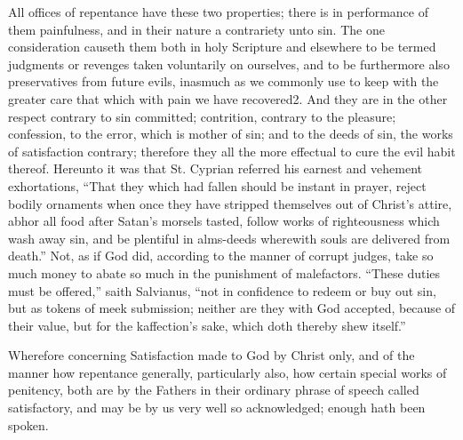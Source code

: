 All offices of repentance have these two properties; there is in performance of them painfulness, and in their nature a contrariety unto sin. The one consideration causeth them both in holy Scripture and elsewhere to be termed judgments or revenges taken voluntarily on ourselves, and to be furthermore also preservatives from future evils, inasmuch as we commonly use to keep with the greater care that which with pain we have recovered2. And they are in the other respect contrary to sin committed; contrition, contrary to the pleasure; confession, to the error, which is mother of sin; and to the deeds of sin, the works of satisfaction contrary; therefore they all the more effectual to cure the evil habit thereof. Hereunto it was that St. Cyprian referred his earnest and vehement exhortations, “That they which had fallen should be instant in prayer, reject bodily ornaments when once they have stripped themselves out of Christ’s attire, abhor all food after Satan’s morsels tasted, follow works of righteousness which wash away sin, and be plentiful in alms-deeds wherewith souls are delivered from death.” Not, as if God did, according to the manner of corrupt  judges, take so much money to abate so much in the punishment of malefactors. “These duties must be offered,” saith Salvianus, “not in confidence to redeem or buy out sin, but as tokens of meek submission; neither are they with God accepted, because of their value, but for the kaffection’s sake, which doth thereby shew itself.”

Wherefore concerning Satisfaction made to God by Christ only, and of the manner how repentance generally, particularly also, how certain special works of penitency, both are by the Fathers in their ordinary phrase of speech called satisfactory, and may be by us very well so acknowledged; enough hath been spoken.

